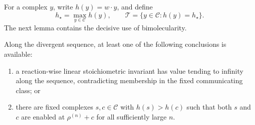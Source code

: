 For a complex \(y\), write \(h(y)=w\cdot y\), and define
\begin{equation}\label{eq:top}
  h_\star=\max_{y\in\mathcal C}h(y),
  \qquad
  \mathcal T=\{y\in\mathcal C:h(y)=h_\star\}.
\end{equation}
The next lemma contains the decisive use of bimolecularity.

\begin{lemma}\label{lem:top}
Along the divergent sequence, at least one of the following conclusions is
available:

\begin{enumerate}[label=\textup{(\roman*)},leftmargin=2.5em]
\item a reaction-wise linear stoichiometric invariant has value tending to
      infinity along the sequence, contradicting membership in the fixed
      communicating class; or
\item there are fixed complexes \(s,c\in\mathcal C\) with
      \(h(s)>h(c)\) such that both \(s\) and \(c\) are enabled at
      \(\rho^{(n)}+c\) for all sufficiently large \(n\).
\end{enumerate}
\end{lemma}

